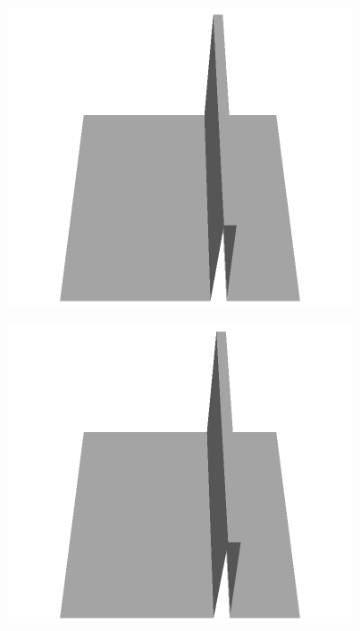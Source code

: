 \documentclass[../document.tex]{subfiles}
\begin{document}
\begin{figure}[H]
\begin{subfigure}[b]{0.065\textwidth}
    \includegraphics[width=\linewidth]{../img/5/custom_patches/walls_front/all/47-3d.png}
    \end{subfigure}
    \begin{subfigure}[b]{0.065\textwidth}
    \includegraphics[width=\linewidth]{../img/5/custom_patches/walls_front/all/46-3d.png}
    \end{subfigure}
    \begin{subfigure}[b]{0.065\textwidth}

\end{subfigure}
\end{figure}
\end{document}
